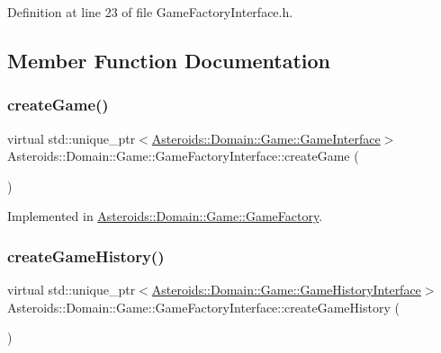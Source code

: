 Definition at line 23 of file Game\+Factory\+Interface.\+h.



\subsection{Member Function Documentation}
\mbox{\label{classAsteroids_1_1Domain_1_1Game_1_1GameFactoryInterface_afee076bbbb08048be9df4e7bbc80d4c1}} 
\subsubsection{\texorpdfstring{create\+Game()}{createGame()}}
{\footnotesize\ttfamily virtual std\+::unique\+\_\+ptr$<$\hyperlink{classAsteroids_1_1Domain_1_1Game_1_1GameInterface}{Asteroids\+::\+Domain\+::\+Game\+::\+Game\+Interface}$>$ Asteroids\+::\+Domain\+::\+Game\+::\+Game\+Factory\+Interface\+::create\+Game (\begin{DoxyParamCaption}{ }\end{DoxyParamCaption})\hspace{0.3cm}{\ttfamily [pure virtual]}}



Implemented in \hyperlink{classAsteroids_1_1Domain_1_1Game_1_1GameFactory_a87ce9a05bdee942acbc9434d32749a76}{Asteroids\+::\+Domain\+::\+Game\+::\+Game\+Factory}.

\mbox{\label{classAsteroids_1_1Domain_1_1Game_1_1GameFactoryInterface_a40f7aecd06daa206b762bfc7896bd47c}} 
\subsubsection{\texorpdfstring{create\+Game\+History()}{createGameHistory()}}
{\footnotesize\ttfamily virtual std\+::unique\+\_\+ptr$<$\hyperlink{classAsteroids_1_1Domain_1_1Game_1_1GameHistoryInterface}{Asteroids\+::\+Domain\+::\+Game\+::\+Game\+History\+Interface}$>$ Asteroids\+::\+Domain\+::\+Game\+::\+Game\+Factory\+Interface\+::create\+Game\+History (\begin{DoxyParamCaption}{ }\end{DoxyParamCaption})\hspace{0.3cm}{\ttfamily [pure virtual]}}



